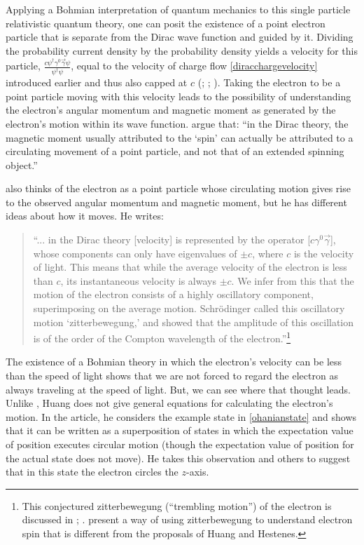 \documentclass[onecolumn,secnumarabic,amsmath,amssymb,balancelastpage,nofootinbib]{article}
\begin{document}
Applying a Bohmian interpretation of quantum mechanics to this single particle relativistic quantum theory, one can posit the existence of a point electron particle that is separate from the Dirac wave function and guided by it.  Dividing the probability current density by the probability density yields a velocity for this particle, $\frac{c\psi^\dagger\gamma^{0} \vec{\gamma}\psi}{\psi^\dagger\psi}$, equal to the velocity of charge flow \eqref{diracchargevelocity} introduced earlier and thus also capped at $c$ (\citealp{bohm1953comments}; \citealp[section 10.4]{bohmhiley}; \citealp[equation 12.2.10]{holland}).  Taking the electron to be a point particle moving with this velocity leads to the possibility of understanding the electron's angular momentum and magnetic moment as generated by the electron's motion within its wave function.  \citet[pg.\ 218]{bohmhiley} argue that: ``in the Dirac theory, the magnetic moment usually attributed to the `spin' can actually be attributed to a circulating movement of a point particle, and not that of an extended spinning object.''

\citet{huang1952} also thinks of the electron as a point particle whose circulating motion gives rise to the observed angular momentum and magnetic moment, but he has different ideas about how it moves.  He writes:
\begin{quote}
``... in the Dirac theory [velocity] is represented by the operator [$c\gamma^{0} \vec{\gamma}$], whose components can only have eigenvalues of $\pm c$, where $c$ is the velocity of light.  This means that while the average velocity of the electron is less than $c$, its instantaneous velocity is always $\pm c$.  We infer from this that the motion of the electron consists of a highly oscillatory component, superimposing on the average motion.  Schr\"{o}dinger called this oscillatory motion `zitterbewegung,' and showed that the amplitude of this oscillation is of the order of the Compton wavelength of the electron.''\footnote{This conjectured zitterbewegung (``trembling motion'') of the electron is discussed in \citet[section 69]{dirac}; \citet[pg.\ 38]{bjorkendrell}.  \citet{barutzanghi} present a way of using zitterbewegung to understand electron spin that is different from the proposals of Huang and Hestenes.}
\end{quote}
The existence of a Bohmian theory in which the electron's velocity can be less than the speed of light shows that we are not forced to regard the electron as always traveling at the speed of light.  But, we can see where that thought leads.  Unlike \citet{bohmhiley}, Huang does not give general equations for calculating the electron's motion.  In the article, he considers the example state in \eqref{ohanianstate} and shows that it can be written as a superposition of states in which the expectation value of position executes circular motion (though the expectation value of position for the actual state does not move).  He takes this observation and others to suggest that in this state the electron circles the $z$-axis.
\end{document}
